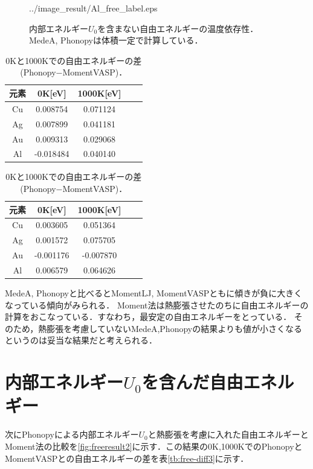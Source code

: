 \begin{figure}[htbp]
\begin{minipage}[b]{0.5\linewidth}
  {../image_result/Al_free_label.eps}
  \label{free4}
 \end{minipage}
 \caption{内部エネルギー$U_0$を含まない自由エネルギーの温度依存性．MedeA, Phonopyは体積一定で計算している．}\label{fig:freeresult}
\end{figure}



\begin{table}[htbp]
  \begin{minipage}[b]{0.48\linewidth}
  \centering
  \caption{0Kと1000Kでの自由エネルギーの差(MedeA$-$MomentVASP)．}
  \label{tb:free-diff}
  \begin{tabular}{ccccc}\hline
    元素 & 0K[eV] & 1000K[eV] \\ \hline \hline
    Cu & 0.008754 & 0.071124 \\
    Ag & 0.007899 & 0.041181\\
    Au & 0.009313 & 0.029068\\
    Al & -0.018484 & 0.040140\\ \hline
  \end{tabular}
 \end{minipage}
 \hspace{0.04\linewidth}
 \begin{minipage}[b]{0.48\linewidth}
 \caption{0Kと1000Kでの自由エネルギーの差(Phonopy$-$MomentVASP)．}
 \label{tb:free-diff2}
  \centering
  \begin{tabular}{ccccc}\hline
    元素 & 0K[eV] & 1000K[eV] \\ \hline \hline
    Cu & 0.003605 & 0.051364  \\
    Ag & 0.001572 & 0.075705 \\
    Au & -0.001176 & -0.007870 \\
    Al & 0.006579 & 0.064626 \\ \hline
  \end{tabular}
 \end{minipage}
\end{table}


MedeA, Phonopyと比べるとMomentLJ, MomentVASPともに傾きが負に大きくなっている傾向がみられる．
Moment法は熱膨張させたのちに自由エネルギーの計算をおこなっている．すなわち，最安定の自由エネルギーをとっている．
そのため，熱膨張を考慮していないMedeA,Phonopyの結果よりも値が小さくなるというのは妥当な結果だと考えられる．





\section{内部エネルギー$U_0$を含んだ自由エネルギー}
次にPhonopyによる内部エネルギー$U_0$と熱膨張を考慮に入れた自由エネルギーとMoment法の比較を\ref{fig:freeresult2}に示す．この結果の0K,1000KでのPhonopyとMomentVASPとの自由エネルギーの差を表\ref{tb:free-diff3}に示す．

